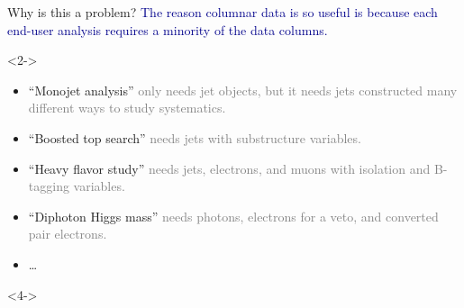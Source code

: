 \documentclass[aspectratio=169]{beamer}
\begin{document}
\begin{frame}{Why is this a problem?}
\vspace{0.5 cm}
\textcolor{darkblue}{The reason columnar data is so useful is because each end-user analysis requires a minority of the data columns.}

\vspace{0.25 cm}
\begin{uncoverenv}<2->
\begin{center}
\begin{minipage}{0.9\linewidth}
\begin{itemize}
\item ``Monojet analysis'' \textcolor{gray}{only needs jet objects, but it needs jets constructed many different ways to study systematics.}
\item ``Boosted top search'' \textcolor{gray}{needs jets with substructure variables.}
\item ``Heavy flavor study'' \textcolor{gray}{needs jets, electrons, and muons with isolation and B-tagging variables.}
\item ``Diphoton Higgs mass'' \textcolor{gray}{needs photons, electrons for a veto, and converted pair electrons.}
\item \ldots
\end{itemize}
\end{minipage}
\end{center}
\end{uncoverenv}

\vspace{0.25 cm}

\begin{uncoverenv}<4->
\vspace{-5 cm}
\begin{center}
\end{center}
\vspace{5 cm}
\end{uncoverenv}
\end{frame}
\end{document}
